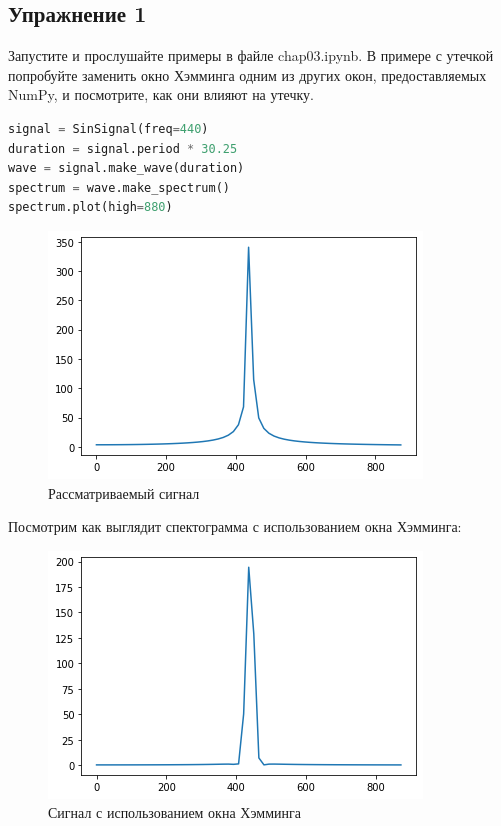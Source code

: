 \subsection{Упражнение 1}

Запустите и прослушайте примеры в файле chap03.ipynb. В примере с утечкой попробуйте заменить окно Хэмминга одним из других окон, предоставляемых NumPy, и посмотрите, как они влияют на утечку.

\begin{lstlisting}[language=Python]
signal = SinSignal(freq=440)
duration = signal.period * 30.25
wave = signal.make_wave(duration)
spectrum = wave.make_spectrum()
spectrum.plot(high=880)
\end{lstlisting}

\begin{figure}[H]
	\begin{center}
		\includegraphics[scale=1]{fig/lab03/lab03_1.png}
		\caption{Рассматриваемый сигнал}
	\end{center}
\end{figure}

Посмотрим как выглядит спектограмма с использованием окна Хэмминга:

\begin{figure}[H]
	\begin{center}
		\includegraphics[scale=1]{fig/lab03/lab03_2.png}
		\caption{Сигнал с использованием окна Хэмминга}
	\end{center}
\end{figure}


